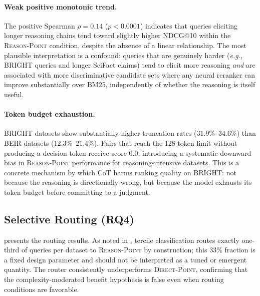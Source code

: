 \documentclass[12pt]{article}
\makeatletter
\newcommand{\ndcg}{NDCG@10}
\newcommand{\direct}{\textsc{Direct-Point}}
\newcommand{\reason}{\textsc{Reason-Point}}
\newcommand{\CoT}{CoT}
\newcommand{\eg}{\textit{e.g.}}
\makeatother
\begin{document}
\paragraph{Weak positive monotonic trend.}
The positive Spearman $\rho=0.14$ ($p<0.0001$) indicates that queries eliciting
longer reasoning chains tend toward slightly higher \ndcg{} within the \reason{}
condition, despite the absence of a linear relationship.  The most plausible
interpretation is a confound: queries that are genuinely harder (\eg, BRIGHT
queries and longer SciFact claims) tend to elicit more reasoning \emph{and}
are associated with more discriminative candidate sets where any neural reranker
can improve substantially over BM25, independently of whether the reasoning
is itself useful.

\paragraph{Token budget exhaustion.}
BRIGHT datasets show substantially higher truncation rates ($31.9$\%--$34.6$\%)
than BEIR datasets ($12.3$\%--$21.4$\%).  Pairs that reach the 128-token limit
without producing a decision token receive score $0.0$, introducing a systematic
downward bias in \reason{} performance for reasoning-intensive datasets.  This
is a concrete mechanism by which \CoT{} harms ranking quality on BRIGHT:
not because the reasoning is directionally wrong, but because the model exhausts
its token budget before committing to a judgment.

\subsection{Selective Routing (RQ4)}
\label{sec:routing_results}

 presents the routing results.  As noted in ,
tercile classification routes exactly one-third of queries per dataset to
\reason{} by construction; this 33\% fraction is a fixed design parameter
and should not be interpreted as a tuned or emergent quantity.  The router
consistently underperforms \direct{}, confirming that the complexity-moderated
benefit hypothesis is false even when routing conditions are favorable.
\end{document}
